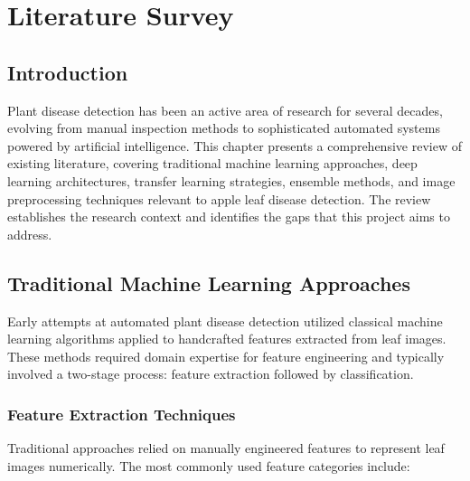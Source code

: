 \documentclass[12pt]{report}
\begin{document}
\chapter{Literature Survey}
\thispagestyle{fancy}

\section{Introduction}

Plant disease detection has been an active area of research for several decades, evolving from manual inspection methods to sophisticated automated systems powered by artificial intelligence. This chapter presents a comprehensive review of existing literature, covering traditional machine learning approaches, deep learning architectures, transfer learning strategies, ensemble methods, and image preprocessing techniques relevant to apple leaf disease detection. The review establishes the research context and identifies the gaps that this project aims to address.

\section{Traditional Machine Learning Approaches}

Early attempts at automated plant disease detection utilized classical machine learning algorithms applied to handcrafted features extracted from leaf images. These methods required domain expertise for feature engineering and typically involved a two-stage process: feature extraction followed by classification.

\subsection{Feature Extraction Techniques}

Traditional approaches relied on manually engineered features to represent leaf images numerically. The most commonly used feature categories include:
\end{document}
